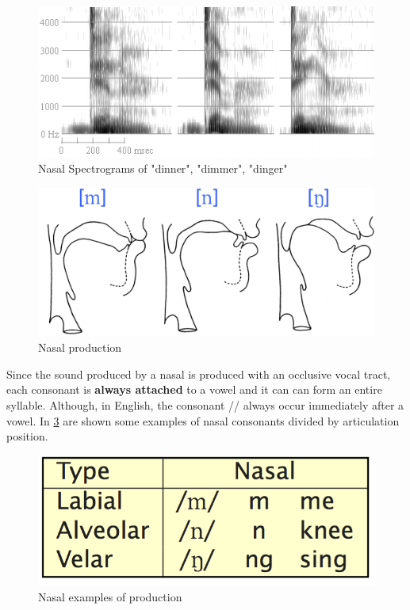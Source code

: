 \begin{figure}[!ht]
    \centering
    \includegraphics[scale=0.6]{Figures/nasal_spectrogram.png}
    \caption{Nasal Spectrograms of "dinner", "dimmer", "dinger" \cite{nasal_spectrogram}}
    \label{fig:nasal_spectrogram}
\end{figure}

\begin{figure}[!ht]
    \centering
    \includegraphics[scale=0.5]{Figures/nasal_production.png}
    \caption{Nasal production \cite{mit_phonetics}}
    \label{fig:nasal_prod}
\end{figure}

\noindent Since the sound produced by a nasal is produced with an occlusive vocal tract, each consonant is \textbf{always attached} to a vowel and it can can form an entire syllable. Although, in English, the consonant /\textbf{}/ always occur immediately after a vowel. In \ref{fig:nsal_ex} are shown some examples of nasal consonants divided by articulation position.

\begin{figure}[!ht]
    \centering
    \includegraphics[scale=0.5]{Figures/nasal_examples.png}
    \caption{Nasal examples of production \cite{mit_phonetics}}
    \label{fig:nsal_ex}
\end{figure}

